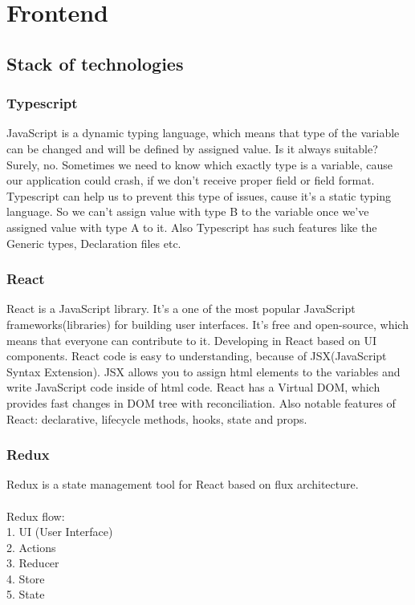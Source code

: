 \chapter{Frontend}\label{ch:B}

\section{Stack of technologies}
    \subsection{Typescript}
    JavaScript is a dynamic typing language, which means that type of the variable can be changed and will be defined by assigned value. Is it always suitable? Surely, no. Sometimes we need to know which exactly type is a variable, cause our application could crash, if we don't receive proper field or field format. Typescript can help us to prevent this type of issues, cause it's a static typing language. So we can't assign value with type B to the variable once we've assigned value with type A to it. Also Typescript has such features like the Generic types, Declaration files etc.
    \subsection{React}
    React is a JavaScript library. It's a one of the most popular JavaScript frameworks(libraries) for building user interfaces. It's free and open-source, which means that everyone can contribute to it. Developing in React based on UI components. React code is easy to understanding, because of JSX(JavaScript Syntax Extension). JSX allows you to assign html elements to the variables and write JavaScript code inside of html code. React has a Virtual DOM, which provides fast changes in DOM tree with reconciliation.
    Also notable features of React: declarative, lifecycle methods, hooks, state and props.
    
    \subsection{Redux}
    Redux is a state management tool for React based on flux architecture. 
    \\\\Redux flow:
    \\1. UI (User Interface)
    \\2. Actions
    \\3. Reducer
    \\4. Store
    \\5. State

